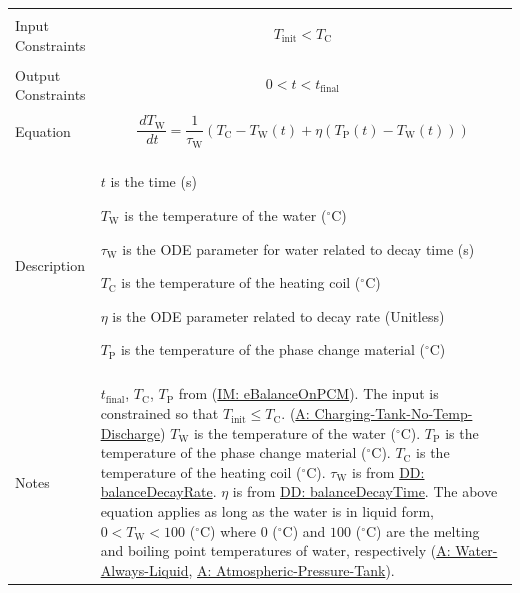 \documentclass[12pt]{article}
\begin{document}
\begin{minipage}{\textwidth}
\begin{tabular}{>{\raggedright}p{}>{\raggedright\arraybackslash}p{}}
\\ \midrule \\
Input Constraints & \begin{displaymath}
                    {T_{\text{init}}}<{T_{\text{C}}}
                    \end{displaymath}
\\ \midrule \\
Output Constraints & \begin{displaymath}
                     0<t<{t_{\text{final}}}
                     \end{displaymath}
\\ \midrule \\
Equation & \begin{displaymath}
           \frac{\,d{T_{\text{W}}}}{\,dt}=\frac{1}{{τ_{\text{W}}}} \left({T_{\text{C}}}-{T_{\text{W}}}\left(t\right)+η \left({T_{\text{P}}}\left(t\right)-{T_{\text{W}}}\left(t\right)\right)\right)
           \end{displaymath}
\\ \midrule \\
Description & \begin{symbDescription}
              \item{$t$ is the time (s)}
              \item{${T_{\text{W}}}$ is the temperature of the water (${}^{\circ}$C)}
              \item{${τ_{\text{W}}}$ is the ODE parameter for water related to decay time (s)}
              \item{${T_{\text{C}}}$ is the temperature of the heating coil (${}^{\circ}$C)}
              \item{$η$ is the ODE parameter related to decay rate (Unitless)}
              \item{${T_{\text{P}}}$ is the temperature of the phase change material (${}^{\circ}$C)}
              \end{symbDescription}
\\ \midrule \\
Notes & ${t_{\text{final}}}$, ${T_{\text{C}}}$, ${T_{\text{P}}}$ from (\hyperref[IM:eBalanceOnPCM]{IM: eBalanceOnPCM}). The input is constrained so that ${T_{\text{init}}}\leq{}{T_{\text{C}}}$. (\hyperref[assumpCTNOD]{A: Charging-Tank-No-Temp-Discharge}) ${T_{\text{W}}}$ is the temperature of the water (${}^{\circ}$C). ${T_{\text{P}}}$ is the temperature of the phase change material (${}^{\circ}$C). ${T_{\text{C}}}$ is the temperature of the heating coil (${}^{\circ}$C). ${τ_{\text{W}}}$ is from \hyperref[DD:balanceDecayRate]{DD: balanceDecayRate}. $η$ is from \hyperref[DD:balanceDecayTime]{DD: balanceDecayTime}. The above equation applies as long as the water is in liquid form, $0<{T_{\text{W}}}<100$ (${}^{\circ}$C) where $0$ (${}^{\circ}$C) and $100$ (${}^{\circ}$C) are the melting and boiling point temperatures of water, respectively (\hyperref[assumpWAL]{A: Water-Always-Liquid}, \hyperref[assumpAPT]{A: Atmospheric-Pressure-Tank}).
        

\end{tabular}
\end{minipage}
\end{document}
